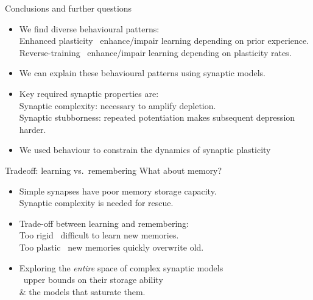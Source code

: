 \documentclass{beamer}%
\begin{document}
\begin{frame}{Conclusions and further questions}
%
 \begin{itemize}
   \item We find diverse behavioural patterns:\\

   \alert{Enhanced plasticity \lto\ enhance/impair} learning depending on prior experience.\\
   \alert{Reverse-training \lto\ enhance/impair} learning depending on plasticity rates.

   \item We can explain these behavioural patterns using synaptic models.

   \item Key required synaptic properties are:\\
   \alert{Synaptic complexity:} necessary to amplify depletion.\\
   \alert{Synaptic stubborness:} repeated potentiation makes subsequent depression harder.

   \item  We used behaviour to constrain the dynamics of synaptic plasticity
\end{itemize}
%
\end{frame}



\begin{frame}{Tradeoff: learning vs.\ remembering}
%
 What about memory?
 \begin{itemize}
   \vp\item Simple synapses have poor memory storage capacity. \\
   Synaptic complexity is needed for rescue.

   \vp\item Trade-off between learning and remembering:\\
   Too rigid \lto\ difficult to learn new memories.\\
   Too plastic \lto\ new memories quickly overwrite old.

   \vp\item Exploring the \emph{entire} space of complex synaptic models \\
   \lto\ upper bounds on their storage ability \\
   \& the models that saturate them.
 \end{itemize}

%
\end{frame}
\end{document}
